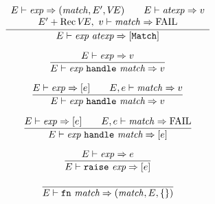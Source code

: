 \begin{equation}        %
\label{closapp-dyn-rule1}
\frac{\begin{array}{c}
      \E\ts\exp\ra(\match,\E',\VE)\qquad\E\ts\atexp\ra\V\\
      \E'+\Rec\VE,\ \V\ts\match\ra\FAIL
      \end{array}
     }
     {\E\ts\appexp\ra[{\tt Match}]}
\end{equation}

\begin{equation}        %
\label{handlexp-dyn-rule1}
\frac{\E\ts\exp\ra\V}
     {\E\ts\handlexp\ra\V}
\end{equation}

\begin{equation}        %
\label{handlexp-dyn-rule2}
\frac{\E\ts\exp\ra[\exval]\qquad\E,\exval\ts\match\ra\V}
     {\E\ts\handlexp\ra\V}
\end{equation}

\begin{equation}        %
\label{handlexp-dyn-rule3}
\frac{\E\ts\exp\ra[\exval]\qquad\E,\exval\ts\match\ra\FAIL}
     {\E\ts\handlexp\ra[\exval]}
\end{equation}

\begin{equation}        %
\frac{\E\ts\exp\ra\exval}
     {\E\ts\raisexp\ra[\exval]}
\end{equation}

\begin{equation}        %
\label{fnexp-dyn-rule}
\frac{}
     {\E\ts\fnexp\ra(\match,\E,\emptymap)}
\end{equation}%

